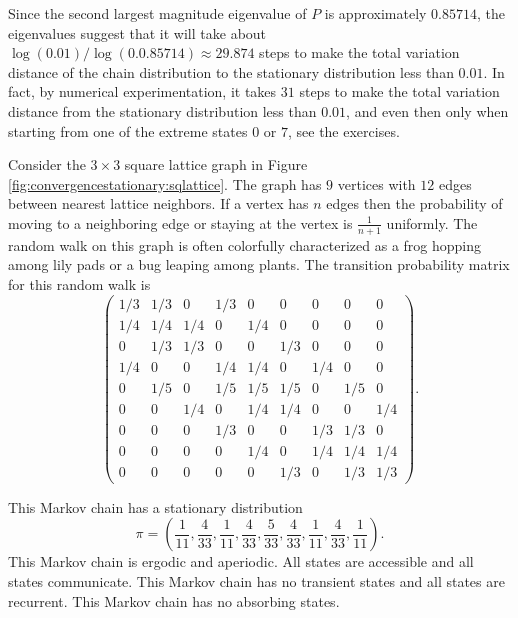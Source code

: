 \documentclass[12pt]{article}
\begin{document}
\begin{example}
    Since the second largest magnitude eigenvalue of \( P \) is
    approximately \( 0.85714 \), the eigenvalues suggest that it will
    take about \( \log(0.01)/\log(0.0.85714) \approx 29.874 \) steps to
    make the total variation distance of the chain distribution to the
    stationary distribution less than \( 0.01 \).  In fact, by numerical
    experimentation, it takes \( 31 \) steps to make the total variation
    distance from the stationary distribution less than \( 0.01 \), and
    even then only when starting from one of the extreme states \( 0 \)
    or \( 7 \), see the exercises.

\end{example}

\begin{example}
    Consider the \( 3 \times 3 \) square lattice graph in Figure~%
    \ref{fig:convergencestationary:sqlattice}.  The graph has \( 9 \)
    vertices with \( 12 \) edges between nearest lattice neighbors.  If
    a vertex has \( n \) edges then the probability of moving to a
    neighboring edge or staying at the vertex is \( \frac{1}{n+1} \)
    uniformly.  The random walk on this graph is often colorfully
    characterized as a frog hopping among lily pads or a bug leaping
    among plants.  The transition probability matrix for this random
    walk is
    \[
        \begin{pmatrix}
            1/3 & 1/3 & 0 & 1/3 & 0 & 0 & 0 & 0 & 0 \\
            1/4 & 1/4 & 1/4 & 0 & 1/4 & 0 & 0 & 0 & 0 \\
            0 & 1/3 & 1/3 & 0 & 0 & 1/3 & 0 & 0 & 0 \\
            1/4 & 0 & 0 & 1/4 & 1/4 & 0 & 1/4 & 0 & 0 \\
            0 & 1/5 & 0 & 1/5 & 1/5 & 1/5 & 0 & 1/5 & 0 \\
            0 & 0 & 1/4 & 0 & 1/4 & 1/4 & 0 & 0 & 1/4 \\
            0 & 0 & 0 & 1/3 & 0 & 0 & 1/3 & 1/3 & 0 \\
            0 & 0 & 0 & 0 & 1/4 & 0 & 1/4 & 1/4 & 1/4 \\
            0 & 0 & 0 & 0 & 0 & 1/3 & 0 & 1/3 & 1/3
        \end{pmatrix}
        .
    \]

    This Markov chain has a stationary distribution
    \[
        \pi = (\frac{1}{11}, \frac{4}{33}, \frac{1}{11}, \frac{4}{33},
        \frac {5}{33}, \frac{4}{33}, \frac{1}{11}, \frac{4}{33}, \frac{1}
        {11}).
    \] This Markov chain is ergodic and aperiodic.  All states are
    accessible and all states communicate.  This Markov chain has no
    transient states and all states are recurrent.  This Markov chain
    has no absorbing states.


\end{example}
\end{document}
